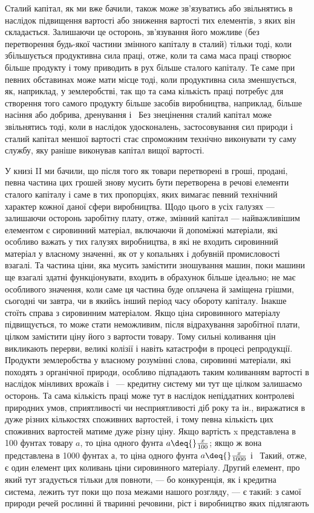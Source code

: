 Сталий капітал, як ми вже бачили, також може зв’язуватись
або звільнятись в наслідок підвищення вартості або зниження
вартості тих елементів, з яких він складається. Залишаючи це
осторонь, зв’язування його можливе (без перетворення будь-якої
частини змінного капіталу в сталий) тільки тоді, коли збільшується
продуктивна сила праці, отже, коли та сама маса праці
створює більше продукту і тому приводить в рух більше сталого капіталу. Те саме при певних
обставинах може мати місце
тоді, коли продуктивна сила зменшується, як, наприклад, у землеробстві, так що та сама кількість
праці потребує для створення
того самого продукту більше засобів виробництва, наприклад,
більше насіння або добрива, дренування і~ Без знецінення
сталий капітал може звільнятись тоді, коли в наслідок удосконалень, застосовування сил природи і~ сталий капітал меншої вартості стає спроможним технічно виконувати ту саму службу, яку раніше
виконував капітал вищої вартості.

У книзі II ми бачили, що після того як товари перетворені
в гроші, продані, певна частина цих грошей знову мусить бути
перетворена в речові елементи сталого капіталу і саме в тих
пропорціях, яких вимагає певний технічний характер кожної
даної сфери виробництва. Щодо цього в усіх галузях — залишаючи осторонь заробітну плату, отже,
змінний капітал — найважливішим елементом є сировинний матеріал, включаючи й допоміжні матеріали,
які особливо важать у тих галузях виробництва, в які не входить сировинний матеріал у власному
значенні, як от у копальнях і добувній промисловості взагалі. Та частина ціни, яка мусить замістити
зношування машин, поки
машини ще взагалі здатні функціонувати, входить в обрахунок
більше ідеально; не має особливого значення, коли саме ця
частина буде оплачена й заміщена грішми, сьогодні чи завтра,
чи в якийсь інший період часу обороту капіталу. Інакше стоїть
справа з сировинним матеріалом. Якщо ціна сировинного матеріалу підвищується, то може стати
неможливим, після відрахування заробітної плати, цілком замістити ціну його з вартости товару. Тому
сильні коливання цін викликають перерви, великі
колізії і навіть катастрофи в процесі репродукції. Продукти
землеробства у власному розумінні слова, сировинні матеріали,
які походять з органічної природи, особливо підпадають таким
коливанням вартості в наслідок мінливих врожаїв і~ — кредитну систему ми тут ще цілком
залишаємо осторонь. Та сама
кількість праці може тут в наслідок непіддатних контролеві природних умов, сприятливості чи
несприятливості діб року та ін.,
виражатися в дуже різних кількостях споживних вартостей,
і тому певна кількість цих споживних вартостей матиме дуже
різну ціну. Якщо вартість x представлена в 100 фунтах товару $a$, то ціна одного фунта $a \deq{} \frac{x}{100}$; якщо
ж вона представлена в 1000 фунтах $а$, то ціна одного фунта $a \deq{} \frac{x}{1000}$ і~ Такий, отже, є один
елемент цих коливань ціни сировинного матеріалу.
Другий елемент, про який тут згадується тільки для повноти, — бо конкуренція, як і кредитна система,
лежить тут поки що поза
межами нашого розгляду, — є такий: з самої природи речей
рослинні й тваринні речовини, ріст і виробництво яких підлягають
\parbreak{}  %
